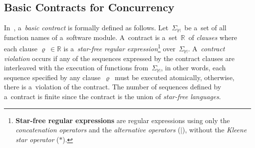 \subsection{Basic Contracts for Concurrency}
\label{sec:contractsBasic}

In~\cite{contracts2017, contracts2015}, a~\emph{basic contract} is
formally defined as follows. Let~$ \Sigma_\mathbb{M} $~be a~set of all
function names of a~software module. A~contract is
a~set~$ \mathbb{R} $~of \emph{clauses} where each clause
$ \varrho\ \in \mathbb{R} $ is a~\emph{star-free regular
expression}\footnote{\textbf{Star-free regular expressions} are
regular expressions using only the \emph{concatenation operators}
and the \emph{alternative operators} ($ | $), without the
\emph{Kleene star operator} ($ * $).} over~$ \Sigma_\mathbb{M} $.
A~\emph{contract violation} occurs if any of the sequences expressed by
the contract clauses are interleaved with the execution of functions
from~$ \Sigma_\mathbb{M} $, in other words, each sequence specified by
any clause~$ \varrho $~must be executed atomically, otherwise, there
is a~violation of the contract. The number of sequences defined by
a~contract is finite since the contract is the union of
\emph{star-free languages}.

